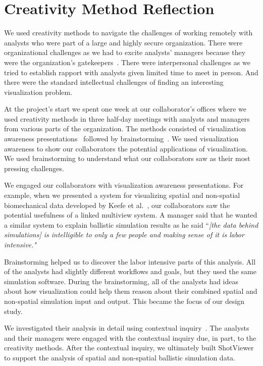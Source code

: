 \section{Creativity Method Reflection}

We used creativity methods to navigate the challenges of working remotely with analysts who were part of a large and highly secure organization. There were organizational challenges as we had to excite analysts' managers because they were the organization's gatekeepers~\cite{Sedlmair2012}. There were interpersonal challenges as we tried to establish rapport with analysts given limited time to meet in person. And there were the standard intellectual challenges of finding an interesting visualization problem.

At the project's start we spent one week at our collaborator's offices where we used creativity methods in three half-day meetings with analysts and managers from various parts of the organization. The methods consisted of visualization awareness presentations~\cite{Lloyd2011} followed by brainstorming~\cite{Osborn1953}. We used visualization awareness to show our collaborators the potential applications of visualization. We used brainstorming to understand what our collaborators saw as their most pressing challenges. 

We engaged our collaborators with visualization awareness presentations. For example, when we presented a system for visualizing spatial and non-spatial biomechanical data developed by Keefe et al.~\cite{Keefe2009}, our collaborators saw the potential usefulness of a linked multiview system. A manager said that he wanted a similar system to explain ballistic simulation results as he said ``\emph{[the data behind simulations] is intelligible to only a few people and making sense of it is labor intensive."} 

Brainstorming helped us to discover the labor intensive parts of this analysis. All of the analysts had slightly different workflows and goals, but they used the same simulation software. During the brainstorming, all of the analysts had ideas about how visualization could help them reason about their combined spatial and non-spatial simulation input and output. This became the focus of our design study.

We investigated their analysis in detail using contextual inquiry~\cite{Holtzblatt1993}. The analysts and their managers were engaged with the contextual inquiry due, in part, to the creativity methods. After the contextual inquiry, we ultimately built ShotViewer to support the analysis of spatial and non-spatial ballistic simulation data.

